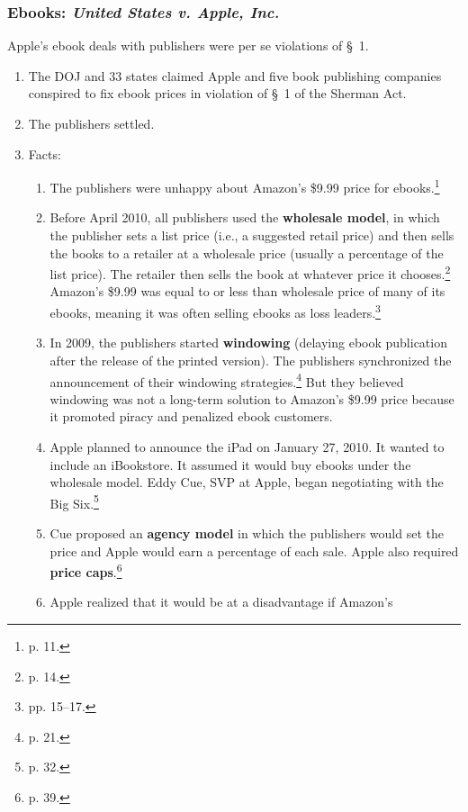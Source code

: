 \subsubsection{Ebooks: \emph{United States v. Apple, Inc.}}

Apple's ebook deals with publishers were per se violations of \S\ 1.

\begin{enumerate}
    \item The DOJ and 33 states claimed Apple and five book publishing companies 
    conspired to fix ebook prices in violation of \S\ 1 of the Sherman Act.
    \item The publishers settled.
    \item Facts:
    \begin{enumerate}
        \item The publishers were unhappy about Amazon's \$9.99 price for 
        ebooks.\footnote{p. 11.}
        \item Before April 2010, all publishers used the \textbf{wholesale  
        model}, in which the publisher sets a list price (i.e., a suggested 
        retail price) and then sells the books to a retailer at a wholesale 
        price (usually a percentage of the list price). The retailer then sells 
        the book at whatever price it chooses.\footnote{p. 14.} Amazon's \$9.99 
        was equal to or less than wholesale price of many of its ebooks, meaning 
        it was often selling ebooks as loss leaders.\footnote{pp. 15--17.}
        \item In 2009, the publishers started \textbf{windowing} (delaying ebook 
        publication after the release of the printed version). The publishers 
        synchronized the announcement of their windowing strategies.\footnote{p.  
        21.} But they believed windowing was not a long-term solution to 
        Amazon's \$9.99 price because it promoted piracy and penalized ebook 
        customers.
        \item Apple planned to announce the iPad on January 27, 2010. It wanted 
        to include an iBookstore. It assumed it would buy ebooks under the 
        wholesale model. Eddy Cue, SVP at Apple, began negotiating with the Big 
        Six.\footnote{p. 32.}
        \item Cue proposed an \textbf{agency model} in which the publishers 
        would set the price and Apple would earn a percentage of each sale.  
        Apple also required \textbf{price caps}.\footnote{p. 39.}
        \item Apple realized that it would be at a disadvantage if Amazon's 

\end{enumerate}
\end{enumerate}

